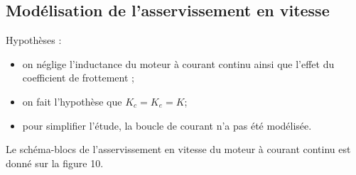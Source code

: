 \begin{multicols}{2}
%
%
%

%
%
%


\section*{Modélisation de l'asservissement en vitesse}

\ifprof
\else

Hypothèses :
\begin{itemize}
\item on néglige l'inductance du moteur à courant continu ainsi que l'effet du coefficient de frottement ;
\item on fait l'hypothèse que $K_c=K_e =K$;
\item pour simplifier l'étude, la boucle de courant n'a pas été modélisée.
\end{itemize}
Le schéma-blocs de l'asservissement en vitesse du moteur à courant continu est donné sur la figure 10.
 


\end{multicols}
